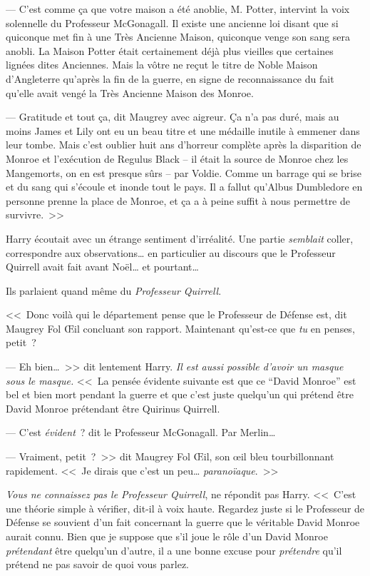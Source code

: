 --- C'est comme ça que votre maison a été anoblie, M. Potter, intervint la voix solennelle du Professeur McGonagall. Il existe une ancienne loi disant que si quiconque met fin à une Très Ancienne Maison, quiconque venge son sang sera anobli. La Maison Potter était certainement déjà plus vieilles que certaines lignées dites Anciennes. Mais la vôtre ne reçut le titre de Noble Maison d'Angleterre qu'après la fin de la guerre, en signe de reconnaissance du fait qu'elle avait vengé la Très Ancienne Maison des Monroe.

--- Gratitude et tout ça, dit Maugrey avec aigreur. Ça n'a pas duré, mais au moins James et Lily ont eu un beau titre et une médaille inutile à emmener dans leur tombe. Mais c'est oublier huit ans d'horreur complète après la disparition de Monroe et l'exécution de Regulus Black -- il était la source de Monroe chez les Mangemorts, on en est presque sûrs -- par Voldie. Comme un barrage qui se brise et du sang qui s'écoule et inonde tout le pays. Il a fallut qu'Albus Dumbledore en personne prenne la place de Monroe, et ça a à peine suffit à nous permettre de survivre.~>>

Harry écoutait avec un étrange sentiment d'irréalité. Une partie \emph{semblait} coller, correspondre aux observations… en particulier au discours que le Professeur Quirrell avait fait avant Noël… et pourtant…

Ils parlaient quand même du \emph{Professeur Quirrell}.

<<~Donc voilà qui le département pense que le Professeur de Défense est, dit Maugrey Fol Œil concluant son rapport. Maintenant qu'est-ce que \emph{tu} en penses, petit~?

--- Eh bien…~>> dit lentement Harry. \emph{Il est aussi possible d'avoir un masque sous le masque.} <<~La pensée évidente suivante est que ce “David Monroe” est bel et bien mort pendant la guerre et que c'est juste quelqu'un qui prétend être David Monroe prétendant être Quirinus Quirrell.

--- C'est \emph{évident}~? dit le Professeur McGonagall. Par Merlin…

--- Vraiment, petit~?~>> dit Maugrey Fol Œil, son œil bleu tourbillonnant rapidement. <<~Je dirais que c'est un peu… \emph{paranoïaque}.~>>

\emph{Vous ne connaissez pas le Professeur Quirrell}, ne répondit pas Harry. <<~C'est une théorie simple à vérifier, dit-il à voix haute. Regardez juste si le Professeur de Défense se souvient d'un fait concernant la guerre que le véritable David Monroe aurait connu. Bien que je suppose que s'il joue le rôle d'un David Monroe \emph{prétendant} être quelqu'un d'autre, il a une bonne excuse pour \emph{prétendre} qu'il prétend ne pas savoir de quoi vous parlez.

